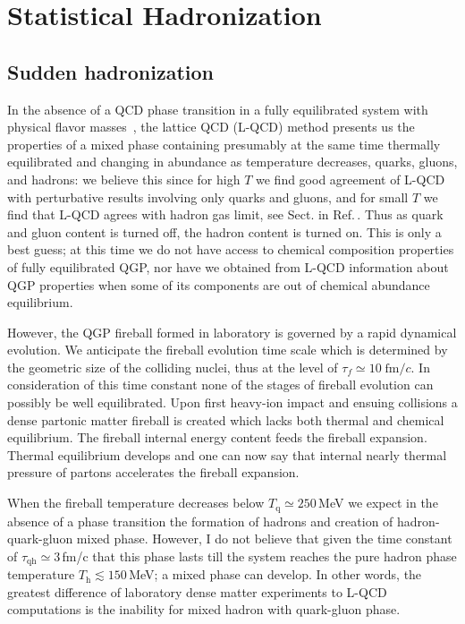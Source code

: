 \documentclass{appolb}
\begin{document}
\section{Statistical Hadronization}\label{sec:SHM}
\subsection{Sudden hadronization}\label{ssec:fire}
In the absence of a QCD phase transition in a fully equilibrated system with physical flavor masses~\cite{Borsanyi:2016ksw}, the lattice QCD (L-QCD) method presents us the properties of a mixed phase containing presumably at the same time thermally equilibrated and changing in abundance as temperature decreases, quarks, gluons, and hadrons: we believe this since for high $T$ we find good agreement of L-QCD with perturbative results involving only quarks and gluons, and for small $T$ we find that L-QCD agrees with hadron gas limit, see Sect. in Ref.\,\cite{Ding:2015ona}. Thus as quark and gluon content is turned off, the hadron content is turned on. This is only a best guess; at this time we do not have access to chemical composition properties of fully equilibrated QGP, nor have we obtained from L-QCD information about QGP properties when some of its components are out of chemical abundance equilibrium.

However, the QGP fireball formed in laboratory is governed by a rapid dynamical evolution. We anticipate the fireball evolution time scale which is determined by the geometric size of the colliding nuclei, thus at the level of $\tau_f\simeq 10\;\mathrm{fm}/c$. In consideration of this time constant none of the stages of fireball evolution can possibly be well equilibrated. Upon first heavy-ion impact and ensuing collisions a dense partonic matter fireball is created which lacks both thermal and chemical equilibrium. The fireball internal energy content feeds the fireball expansion. Thermal equilibrium develops and one can now say that internal nearly thermal pressure of partons accelerates the fireball expansion. 

When the fireball temperature decreases below $T_\mathrm{q}\simeq 250$\,MeV we expect in the absence of a phase transition the formation of hadrons and creation of hadron-quark-gluon mixed phase. However, I do not believe that given the time constant of $\tau_\mathrm{qh}\simeq 3$\,fm/c that this phase lasts till the system reaches the pure hadron phase temperature $T_\mathrm{h}\lesssim 150$\,MeV; a mixed phase can develop. In other words, the greatest difference of laboratory dense matter experiments to L-QCD computations is the inability for mixed hadron with quark-gluon phase. 
\end{document}
